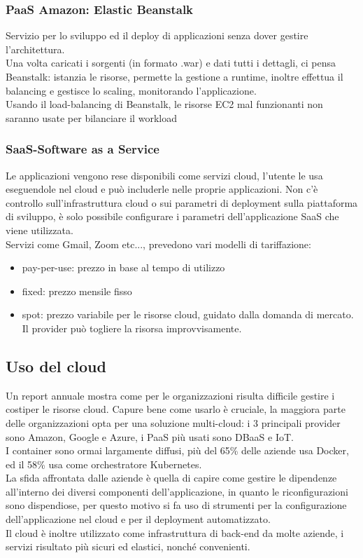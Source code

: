 \documentclass[16px]{article}
\begin{document}
\subsubsection{PaaS Amazon: Elastic Beanstalk}
Servizio per lo sviluppo ed il deploy di applicazioni senza dover gestire l'architettura. \\Una volta caricati i sorgenti (in formato .war) e dati tutti i dettagli, ci pensa Beanstalk: istanzia le risorse, permette la gestione a runtime, inoltre effettua il balancing e gestisce lo scaling, monitorando l'applicazione.\\ Usando il load-balancing di Beanstalk, le risorse EC2 mal funzionanti non saranno usate per bilanciare il workload
\subsubsection{SaaS-Software as a Service}
Le applicazioni vengono rese disponibili come servizi cloud, l'utente le usa eseguendole nel cloud e può includerle nelle proprie applicazioni. Non c'è controllo sull'infrastruttura cloud o sui parametri di deployment sulla piattaforma di sviluppo, è solo possibile configurare i parametri dell'applicazione SaaS che viene utilizzata.\\ Servizi come Gmail, Zoom etc..., prevedono vari modelli di tariffazione:
\begin{itemize}
\item pay-per-use: prezzo in base al tempo di utilizzo
\item fixed: prezzo mensile fisso
\item spot: prezzo variabile per le risorse cloud, guidato dalla domanda di mercato. Il provider può togliere la risorsa improvvisamente.
\end{itemize}
\subsection{Uso del cloud}
Un report annuale mostra come per le organizzazioni risulta difficile gestire i costiper le risorse cloud. Capure bene come usarlo è cruciale, la maggiora parte delle organizzazioni opta per una soluzione multi-cloud: i 3 principali provider sono Amazon, Google e Azure, i PaaS più usati sono DBaaS e IoT.\\ I container sono ormai largamente diffusi, più del 65\% delle aziende usa Docker, ed il 58\% usa come orchestratore Kubernetes.\\ La sfida affrontata dalle aziende è quella di capire come gestire le dipendenze all'interno dei diversi componenti dell'applicazione, in quanto le riconfigurazioni sono dispendiose, per questo motivo si fa uso di strumenti per la configurazione dell'applicazione nel cloud e per il deployment automatizzato.\\ Il cloud è inoltre utilizzato come infrastruttura di back-end da molte aziende, i servizi risultato più sicuri ed elastici, nonché convenienti.
\end{document}
